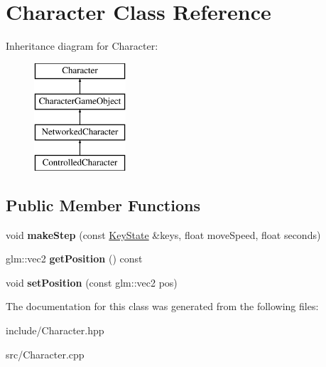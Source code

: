 \hypertarget{class_character}{\section{Character Class Reference}
\label{class_character}
}
Inheritance diagram for Character\-:\begin{figure}[H]
\begin{center}
\leavevmode
\includegraphics[height=4.000000cm]{class_character}
\end{center}
\end{figure}
\subsection*{Public Member Functions}
\begin{DoxyCompactItemize}
\item 
\hypertarget{class_character_a6eacdb4394fb452a28f11996b2802770}{void {\bfseries make\-Step} (const \hyperlink{class_key_state}{Key\-State} \&keys, float move\-Speed, float seconds)}\label{class_character_a6eacdb4394fb452a28f11996b2802770}

\item 
\hypertarget{class_character_ad48060d202444b65437a0f2b94b98db1}{glm\-::vec2 {\bfseries get\-Position} () const }\label{class_character_ad48060d202444b65437a0f2b94b98db1}

\item 
\hypertarget{class_character_aefe8c4e9a1e3aedb640fb636f6920a6c}{void {\bfseries set\-Position} (const glm\-::vec2 pos)}\label{class_character_aefe8c4e9a1e3aedb640fb636f6920a6c}

\end{DoxyCompactItemize}


The documentation for this class was generated from the following files\-:\begin{DoxyCompactItemize}
\item 
include/Character.\-hpp\item 
src/Character.\-cpp\end{DoxyCompactItemize}
